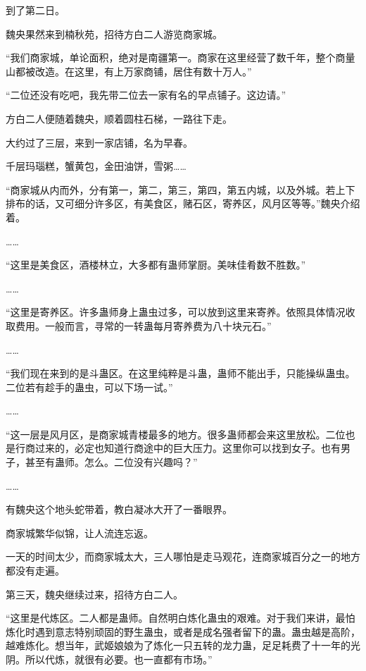 
\begin{this_body}



到了第二日。

魏央果然来到楠秋苑，招待方白二人游览商家城。

“我们商家城，单论面积，绝对是南疆第一。商家在这里经营了数千年，整个商量山都被改造。在这里，有上万家商铺，居住有数十万人。”

“二位还没有吃吧，我先带二位去一家有名的早点铺子。这边请。”

方白二人便随着魏央，顺着圆柱石梯，一路往下走。

大约过了三层，来到一家店铺，名为早春。

千层玛瑙糕，蟹黄包，金田油饼，雪粥……

“商家城从内而外，分有第一，第二，第三，第四，第五内城，以及外城。若上下排布的话，又可细分许多区，有美食区，赌石区，寄养区，风月区等等。”魏央介绍着。

……

“这里是美食区，酒楼林立，大多都有蛊师掌厨。美味佳肴数不胜数。”

……

“这里是寄养区。许多蛊师身上蛊虫过多，可以放到这里来寄养。依照具体情况收取费用。一般而言，寻常的一转蛊每月寄养费为八十块元石。”

……

“我们现在来到的是斗蛊区。在这里纯粹是斗蛊，蛊师不能出手，只能操纵蛊虫。二位若有趁手的蛊虫，可以下场一试。”

……

“这一层是风月区，是商家城青楼最多的地方。很多蛊师都会来这里放松。二位也是行商过来的，必定也知道行商途中的巨大压力。这里你可以找到女子。也有男子，甚至有蛊师。怎么。二位没有兴趣吗？”

……

有魏央这个地头蛇带着，教白凝冰大开了一番眼界。

商家城繁华似锦，让人流连忘返。

一天的时间太少，而商家城太大，三人哪怕是走马观花，连商家城百分之一的地方都没有走遍。

第三天，魏央继续过来，招待方白二人。

“这里是代炼区。二人都是蛊师。自然明白炼化蛊虫的艰难。对于我们来讲，最怕炼化时遇到意志特别顽固的野生蛊虫，或者是成名强者留下的蛊。蛊虫越是高阶，越难炼化。想当年，武姬娘娘为了炼化一只五转的龙力蛊，足足耗费了十一年的光阴。所以代炼，就很有必要。也一直都有市场。”


\end{this_body}
